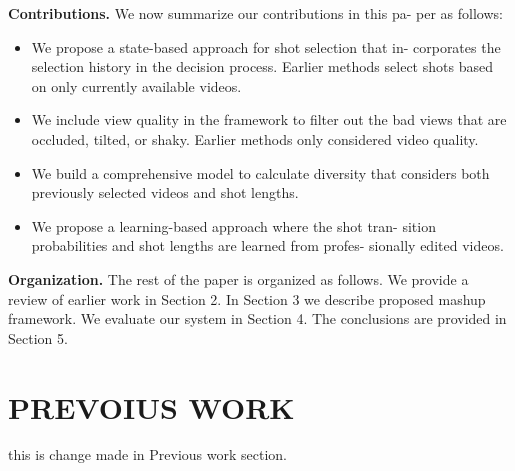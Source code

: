 \documentclass{new}
\begin{document}
\textbf{Contributions.} We now summarize our contributions in this pa-
per as follows:

\begin{itemize}
\item{We propose a state-based approach for shot selection that in-
corporates the selection history in the decision process. Earlier methods select shots based on only currently available
videos.}
\item We include view quality in the framework to filter out the
bad views that are occluded, tilted, or shaky. Earlier methods
only considered video quality.
\item We build a comprehensive model to calculate diversity that
considers both previously selected videos and shot lengths.

\item We propose a learning-based approach where the shot tran-
sition probabilities and shot lengths are learned from profes-
sionally edited videos.
\end{itemize}

\textbf{Organization.} The rest of the paper is organized as follows.
We provide a review of earlier work in Section 2. In Section 3 we
describe proposed mashup framework. We evaluate our system in
Section 4. The conclusions are provided in Section 5.

\section{PREVOIUS WORK}
this is change made in Previous work section.
\end{document}

